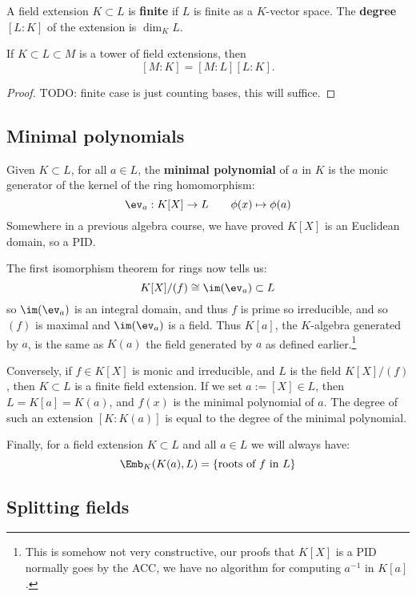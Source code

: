 \documentclass{article}
\begin{document}
\begin{definition}
    A field extension $K\subset L$ is \textbf{finite} if $L$ is finite as a $K$-vector space. The \textbf{degree} $[L:K]$ of the extension is $\dim_KL$.
\end{definition}

\begin{proposition}
    If $K\subset L \subset M$ is a tower of field extensions, then \[[M:K]=[M:L][L:K].\]\begin{proof}
        TODO: finite case is just counting bases, this will suffice.
    \end{proof}
\end{proposition}

\subsection{Minimal polynomials}

\begin{definition}
    Given $K\subset L$, for all $a\in L$, the \textbf{minimal polynomial} of $a$ in $K$ is the monic generator of the kernel of the ring homomorphism: \[
        \ev_a : K[X] \rightarrow L \qquad \phi(x) \mapsto \phi(a)
    \] Somewhere in a previous algebra course, we have proved $K[X]$ is an Euclidean domain, so a PID.
\end{definition}

The first isomorphism theorem for rings now tells us: \[
    K[X] / (f) \cong \im(\ev_a) \subset L
\] so $\im(\ev_a)$ is an integral domain, and thus $f$ is prime so irreducible, and so $(f)$ is maximal and $\im(\ev_a)$ is a field. Thus $K[a]$, the $K$-algebra generated by $a$, is the same as $K(a)$ the field generated by $a$ as defined earlier.\footnote{
    This is somehow not very constructive, our proofs that $K[X]$ is a PID normally goes by the ACC, we have no algorithm for computing $a^{-1}$ in $K[a]$.
}

Conversely, if $f\in K[X]$ is monic and irreducible, and $L$ is the field $K[X]/(f)$, then $K\subset L$ is a finite field extension. If we set $a:=[X] \in L$, then $L=K[a]=K(a)$, and $f(x)$ is the minimal polynomial of $a$. The degree of such an extension $[K:K(a)]$ is equal to the degree of the minimal polynomial.

Finally, for a field extension $K\subset L$ and all $a \in L$ we will always have: \[
    \Emb_K(K(a),L) = \{\text{roots of $f$ in $L$}\}
\]

\subsection{Splitting fields}
\end{document}
